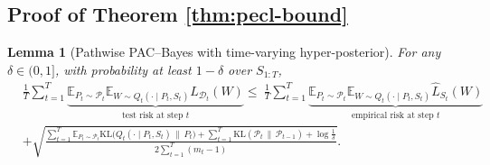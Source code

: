 \documentclass{article}
\theoremstyle{plain}
\newtheorem{lemma}[theorem]{Lemma}
\theoremstyle{definition}
\theoremstyle{remark}
\begin{document}
\subsection{Proof of Theorem \ref{thm:pecl-bound}}
\label{proof:theorem}


\begin{lemma}[Pathwise PAC--Bayes with time-varying hyper-posterior]
\label{the: full}
For any $\delta\in(0,1]$, with probability at least $1-\delta$ over $S_{1:T}$,
\begin{equation}
\begin{aligned} 
& \frac{1}{T} \sum_{t=1}^T \underbrace{\mathbb{E}_{P_t \sim \mathcal{P}_t} \mathbb{E}_{W \sim Q_t(\cdot \mid P_t, S_t)} L_{\mathcal{D}_t}(W)}_{\text{test risk at step } t} 
\le \ \frac{1}{T} \sum_{t=1}^T \underbrace{\mathbb{E}_{P_t \sim \mathcal{P}_t} \mathbb{E}_{W \sim Q_t(\cdot \mid P_t, S_t)} \hat{L}_{S_t}(W)}_{\text{empirical risk at step } t} \\ 
& + \sqrt{\frac{ \sum_{t=1}^T \mathbb{E}_{P_t \sim \mathcal{P}_t} \mathrm{KL}\big(Q_t(\cdot \mid P_t, S_t) \,\|\, P_t\big) + \sum_{t=1}^T \mathrm{KL}(\mathcal{P}_t \,\|\, \mathcal{P}_{t-1}) + \log\frac{1}{\delta} }{2 \sum_{t=1}^T (m_t - 1)}}. 
\end{aligned} 
\end{equation}
\end{lemma}
\end{document}
